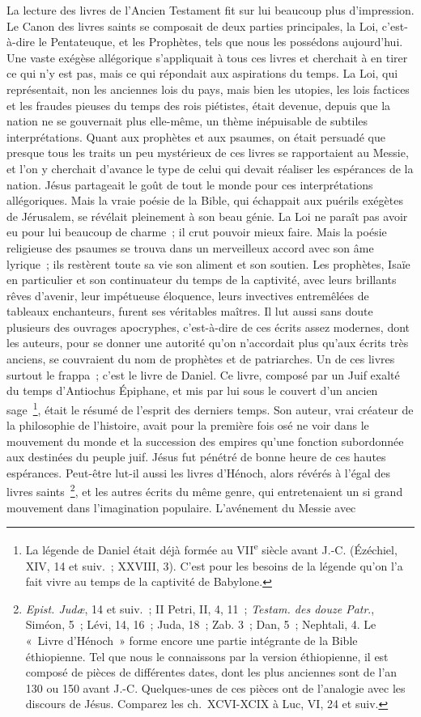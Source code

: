 \documentclass[french,twoside]{book} %
\begin{document}
La lecture des livres de l’Ancien Testament fit sur lui beaucoup plus d’impression. Le Canon des livres saints se composait de deux parties principales, la Loi, c’est-à-dire le Pentateuque, et les Prophètes, tels que nous les possédons aujourd’hui. Une vaste exégèse allégorique s’appliquait à tous ces livres et cherchait à en tirer ce qui n’y est pas, mais ce qui répondait aux aspirations du temps. La Loi, qui représentait, non les anciennes lois du pays, mais bien les utopies, les lois factices et les fraudes pieuses du temps des rois piétistes, était devenue, depuis que la nation ne se gouvernait plus elle-même, un thème inépuisable de subtiles interprétations. Quant aux prophètes et aux psaumes, on était persuadé que presque tous les traits un peu mystérieux de ces livres se rapportaient au Messie, et l’on y cherchait d’avance le type de celui qui devait réaliser les espérances de la nation. Jésus partageait le goût de tout le monde pour ces interprétations allégoriques. Mais la vraie poésie de la Bible, qui échappait aux puérils exégètes de Jérusalem, se révélait pleinement à son beau génie. La Loi ne paraît pas avoir eu pour lui beaucoup de charme ; il crut pouvoir mieux faire. Mais la poésie religieuse des psaumes se trouva dans un merveilleux accord avec son âme lyrique ; ils restèrent toute sa vie son aliment et son soutien. Les prophètes, Isaïe en particulier et son continuateur du temps de la captivité, avec leurs brillants rêves d’avenir, leur impétueuse éloquence, leurs invectives entremêlées de tableaux enchanteurs, furent ses véritables maîtres. Il lut aussi sans doute plusieurs des ouvrages apocryphes, c’est-à-dire de ces écrits assez modernes, dont les auteurs, pour se donner une autorité qu’on n’accordait plus qu’aux écrits très anciens, se couvraient du nom de prophètes et de patriarches. Un de ces livres surtout le frappa ; c’est le livre de Daniel. Ce livre, composé par un Juif exalté du temps d’Antiochus Épiphane, et mis par lui sous le couvert d’un ancien sage \footnote{ La légende de Daniel était déjà formée au VII\textsuperscript{e} siècle avant J.-C. (Ézéchiel, XIV, 14 et suiv. ; XXVIII, 3). C’est pour les besoins de la légende qu’on l’a fait vivre au temps de la captivité de Babylone.}, était le résumé de l’esprit des derniers temps. Son auteur, vrai créateur de la philosophie de l’histoire, avait pour la première fois osé ne voir dans le mouvement du monde et la succession des empires qu’une fonction subordonnée aux destinées du peuple juif. Jésus fut pénétré de bonne heure de ces hautes espérances. Peut-être lut-il aussi les livres d’Hénoch, alors révérés à l’égal des livres saints \footnote{{\itshape Epist. Judæ}, 14 et suiv. ; II Petri, II, 4, 11 ; {\itshape Testam. des douze Patr}., Siméon, 5 ; Lévi, 14, 16 ; Juda, 18 ; Zab. 3 ; Dan, 5 ; Nephtali, 4. Le « Livre d’Hénoch » forme encore une partie intégrante de la Bible éthiopienne. Tel que nous le connaissons par la version éthiopienne, il est composé de pièces de différentes dates, dont les plus anciennes sont de l’an 130 ou 150 avant J.-C. Quelques-unes de ces pièces ont de l’analogie avec les discours de Jésus. Comparez les ch. XCVI-XCIX à Luc, VI, 24 et suiv.}, et les autres écrits du même genre, qui entretenaient un si grand mouvement dans l’imagination populaire. L’avénement du Messie avec 
\end{document}

